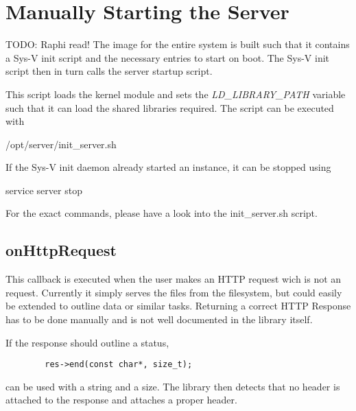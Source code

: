 \section{Manually Starting the Server} %
\label{sec:devguide:server:build}

TODO: Raphi read!
The image for the entire system is built such that it contains a Sys-V init script and the necessary entries to start on boot.
The Sys-V init script then in turn calls the server startup script.

This script loads the kernel module and sets the \textit{LD\_LIBRARY\_PATH} variable such that it can load the shared libraries required. The script can be executed with
\begin{commandshell}
    /opt/server/init_server.sh
\end{commandshell}

If the Sys-V init daemon already started an instance, it can be stopped using

\begin{commandshell}
    service server stop
\end{commandshell}

For the exact commands, please have a look into the init\_server.sh script.

\subsection{onHttpRequest} %
\label{subsec:devguide:server:onhttprequest}

This callback  is executed  when the user  makes an HTTP  request wich  is not
an   request. Currently  it  simply serves  the  files from  the
filesystem, but  could easily be  extended to  outline data or  similar tasks.
Returning a  correct HTTP  Response has to  be done manually  and is  not well
documented in the library itself.

If the response should outline a  status,
\begin{tcolorbox}
    \begin{verbatim}
        res->end(const char*, size_t);
    \end{verbatim}
\end{tcolorbox}
\noindent can be used with a string  and a size. The library then detects that
no header  is attached  to the  response and attaches  a proper  
header.

